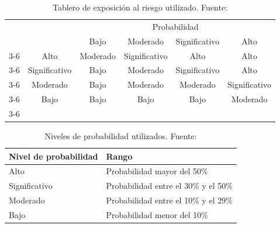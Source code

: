 \documentclass{subfiles}
\begin{document}
\begin{table}[ht]
\centering
\begin{tabular}{cccccc}
                         &                                    & \multicolumn{4}{c}{Probabilidad}                                                                                                             \\
                         &                                    & Bajo                          & Moderado                           & Significativo                      & Alto                               \\ \cline{3-6} 
\multirow{4}{*}{\begin{turn}{90}Impacto\end{turn}} & \multicolumn{1}{c|}{Alto}          & \multicolumn{1}{c|}{Moderado} & \multicolumn{1}{c|}{Significativo} & \multicolumn{1}{c|}{Alto}          & \multicolumn{1}{c|}{Alto}          \\ \cline{3-6} 
                         & \multicolumn{1}{c|}{Significativo} & \multicolumn{1}{c|}{Bajo}     & \multicolumn{1}{c|}{Moderado}      & \multicolumn{1}{c|}{Significativo} & \multicolumn{1}{c|}{Alto}          \\ \cline{3-6} 
                         & \multicolumn{1}{c|}{Moderado}      & \multicolumn{1}{c|}{Bajo}     & \multicolumn{1}{c|}{Moderado}      & \multicolumn{1}{c|}{Moderado}      & \multicolumn{1}{c|}{Significativo} \\ \cline{3-6} 
                         & \multicolumn{1}{c|}{Bajo}          & \multicolumn{1}{c|}{Bajo}     & \multicolumn{1}{c|}{Bajo}          & \multicolumn{1}{c|}{Bajo}          & \multicolumn{1}{c|}{Moderado}      \\ \cline{3-6} 
\end{tabular}
\caption[Tablero de exposición al riesgo utilizado]{Tablero de exposición al riesgo utilizado. Fuente: }
\label{tab:exposicion_al_riesgo}
\end{table}

\begin{table}[ht]
\centering
\begin{tabular}{ll}
\hline
\textbf{Nivel de probabilidad} & \textbf{Rango}                       \\ \hline
Alto                           & Probabilidad mayor del 50\%          \\ \hline
Significativo                  & Probabilidad entre el 30\% y el 50\% \\ \hline
Moderado                       & Probabilidad entre el 10\% y el 29\% \\ \hline
Bajo                           & Probabilidad menor del 10\%          \\ \hline
\end{tabular}
\caption[Niveles de probabilidad utilizados]{Niveles de probabilidad utilizados. Fuente: }
\label{tab:probabilidades_de_riesgos}
\end{table}
\end{document}
